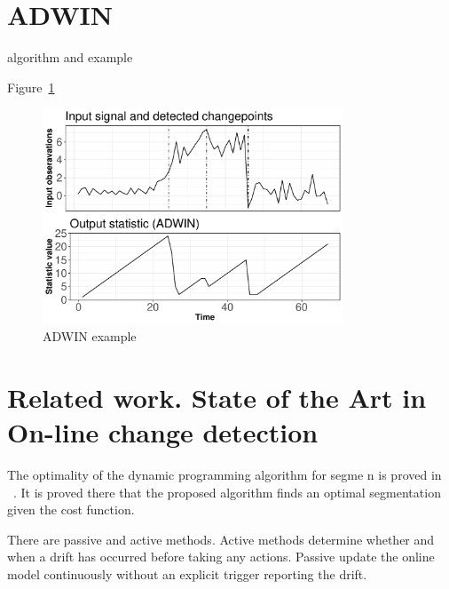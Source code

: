 \section{ADWIN}
algorithm and example

Figure~\ref{fig:adwin_demo1}
\begin{figure}
    \centering
    \includegraphics[width=0.8\textwidth]{./img/adwin_demo1.pdf}
    \caption{ADWIN example}
    \label{fig:adwin_demo1}
\end{figure}

\section{Related work. State of the Art in On-line change detection}
The optimality of the dynamic programming
algorithm for segme n is proved in
~\cite{Jackson2005}. It is proved there that the
proposed algorithm finds an optimal segmentation
given the cost function.

There are passive and active methods.  Active
methods determine whether and when a drift has
occurred before taking any actions.  Passive
update the online model continuously without an
explicit trigger reporting the drift.


